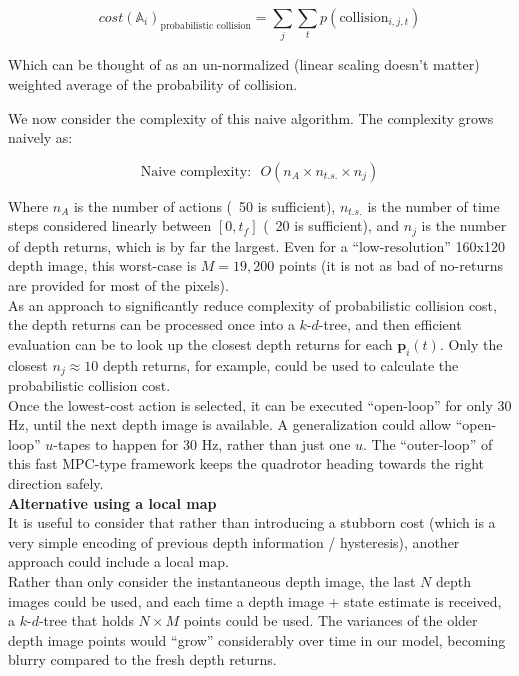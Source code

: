 \documentclass[paper=a4, fontsize=11pt]{scrartcl} %
\numberwithin{equation}{section} %
\numberwithin{figure}{section} %
\numberwithin{table}{section} %
\begin{document}
$$cost(\mathbb{A}_i)_{\text{probabilistic collision}} = \sum_j \sum_t p(\text{collision}_{i,j,t}) $$

Which can be thought of as an un-normalized (linear scaling doesn't matter) weighted average of the probability of collision.

We now consider the complexity of this naive algorithm.  The complexity grows naively as:

$$\text{Naive complexity:} \ \ \ O( n_{A} \times n_{t.s.} \times n_{j})$$

Where $n_A$ is the number of actions (~50 is sufficient), $n_{t.s.}$ is the number of time steps considered linearly between $[0, t_f]$ (~20 is sufficient), and $n_{j}$ is the number of depth returns, which is by far the largest.  Even for a ``low-resolution'' 160x120 depth image, this worst-case is $M=19,200$ points (it is not as bad of no-returns are provided for most of the pixels).\\

As an approach to significantly reduce complexity of probabilistic collision cost, the depth returns can be processed once into a $k$-$d$-tree, and then efficient evaluation can be to look up the closest depth returns for each $\mathbf{p}_i(t)$.  Only the closest $n_j \approx 10$ depth returns, for example, could be used to calculate the probabilistic collision cost.\\

Once the lowest-cost action is selected, it can be executed ``open-loop'' for only 30 Hz, until the next depth image is available.  A generalization could allow ``open-loop'' $u$-tapes to happen for 30 Hz, rather than just one $u$.  The ``outer-loop'' of this fast MPC-type framework keeps the quadrotor heading towards the right direction safely.\\

\textbf{Alternative using a local map}
\\

It is useful to consider that rather than introducing a stubborn cost (which is a very simple encoding of previous depth information / hysteresis), another approach could include a local map.\\

Rather than only consider the instantaneous depth image, the last $N$ depth images could be used, and each time a depth image + state estimate is received, a $k$-$d$-tree that holds $N \times M$ points could be used.  The variances of the older depth image points would ``grow'' considerably over time in our model, becoming blurry compared to the fresh depth returns.  \\
\end{document}
